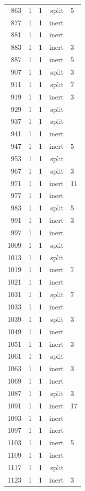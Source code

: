 \begin{longtable}{rrrrl}
863 & 1 & 1 & split & 5 \\
877 & 1 & 1 & inert &  \\
881 & 1 & 1 & inert &  \\
883 & 1 & 1 & inert & 3 \\
887 & 1 & 1 & inert & 5 \\
907 & 1 & 1 & split & 3 \\
911 & 1 & 1 & split & 7 \\
919 & 1 & 1 & inert & 3 \\
929 & 1 & 1 & split &  \\
937 & 1 & 1 & split &  \\
941 & 1 & 1 & inert &  \\
947 & 1 & 1 & inert & 5 \\
953 & 1 & 1 & split &  \\
967 & 1 & 1 & split & 3 \\
971 & 1 & 1 & inert & 11 \\
977 & 1 & 1 & inert &  \\
983 & 1 & 1 & split & 5 \\
991 & 1 & 1 & inert & 3 \\
997 & 1 & 1 & inert &  \\
1009 & 1 & 1 & split &  \\
1013 & 1 & 1 & split &  \\
1019 & 1 & 1 & inert & 7 \\
1021 & 1 & 1 & inert &  \\
1031 & 1 & 1 & split & 7 \\
1033 & 1 & 1 & inert &  \\
1039 & 1 & 1 & split & 3 \\
1049 & 1 & 1 & inert &  \\
1051 & 1 & 1 & inert & 3 \\
1061 & 1 & 1 & split &  \\
1063 & 1 & 1 & inert & 3 \\
1069 & 1 & 1 & inert &  \\
1087 & 1 & 1 & split & 3 \\
1091 & 1 & 1 & inert & 17 \\
1093 & 1 & 1 & inert &  \\
1097 & 1 & 1 & inert &  \\
1103 & 1 & 1 & inert & 5 \\
1109 & 1 & 1 & inert &  \\
1117 & 1 & 1 & split &  \\
1123 & 1 & 1 & inert & 3 \\

\end{longtable}

